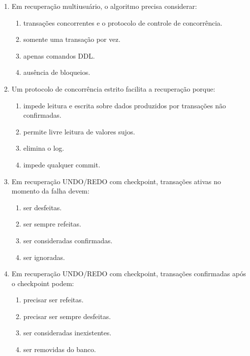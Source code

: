 \documentclass[12pt,a4paper]{article}
\begin{document}
\begin{enumerate}[label=\textbf{Q\arabic*.}]
\item Em recuperação multiusuário, o algoritmo precisa considerar:

\begin{enumerate}[label=\alph*)]
    \item transações concorrentes e o protocolo de controle de concorrência.
    \item somente uma transação por vez.
    \item apenas comandos DDL.
    \item ausência de bloqueios.
\end{enumerate}

\item Um protocolo de concorrência estrito facilita a recuperação porque:

\begin{enumerate}[label=\alph*)]
    \item impede leitura e escrita sobre dados produzidos por transações não confirmadas.
    \item permite livre leitura de valores sujos.
    \item elimina o log.
    \item impede qualquer commit.
\end{enumerate}

\item Em recuperação UNDO/REDO com checkpoint, transações ativas no momento da falha devem:

\begin{enumerate}[label=\alph*)]
    \item ser desfeitas.
    \item ser sempre refeitas.
    \item ser consideradas confirmadas.
    \item ser ignoradas.
\end{enumerate}

\item Em recuperação UNDO/REDO com checkpoint, transações confirmadas após o checkpoint podem:

\begin{enumerate}[label=\alph*)]
    \item precisar ser refeitas.
    \item precisar ser sempre desfeitas.
    \item ser consideradas inexistentes.
    \item ser removidas do banco.
\end{enumerate}


\end{enumerate}
\end{document}
